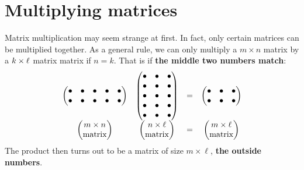 \documentclass{ximera}
\begin{document}
\section{Multiplying matrices}



Matrix multiplication may seem strange at first. In fact, only certain
matrices can be multiplied together. As a general rule, we can only
multiply a $m \times n$ matrix by a $k \times \ell$ matrix matrix if
$n=k$. That is if \textbf{the middle two numbers match}:
\[
\begin{matrix}
\begin{pmatrix}
    \bullet & \bullet & \bullet & \bullet & \bullet\\
    \bullet & \bullet & \bullet & \bullet & \bullet\\
\end{pmatrix}
&
\begin{pmatrix}
    \bullet & \bullet &\bullet \\\bullet & \bullet & \bullet \\  \bullet & \bullet & \bullet \\\bullet & \bullet & \bullet \\ \bullet & \bullet & \bullet \end{pmatrix} &= &
\begin{pmatrix}
  \bullet & \bullet &\bullet \\\bullet & \bullet &  \bullet
\end{pmatrix}\\
\begin{pmatrix}
  m\times n\\
  \text{matrix}
\end{pmatrix} &
\begin{pmatrix}
  n\times \ell\\
  \text{matrix}
\end{pmatrix}
&= & \begin{pmatrix}
  m\times \ell\\
  \text{matrix}
\end{pmatrix}
\end{matrix}
\]
The product then turns out to be a matrix of size $m\times \ell$, \textbf{the
outside numbers}.
\end{document}
